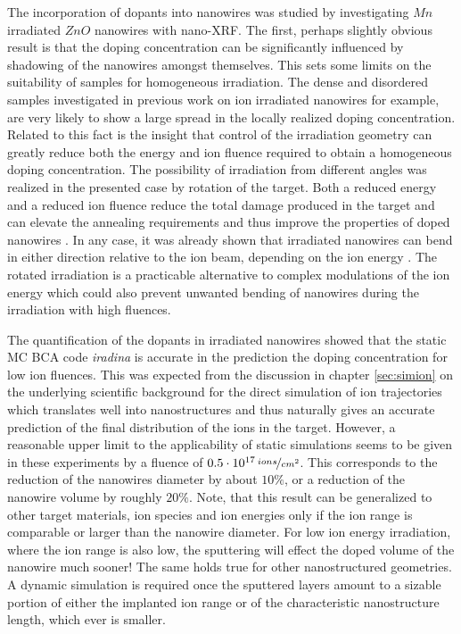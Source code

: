 The incorporation of dopants into nanowires was studied by investigating $Mn$ irradiated $ZnO$ nanowires with nano-XRF. The first, perhaps slightly obvious result is that the doping concentration can be significantly influenced by shadowing of the nanowires amongst themselves. This sets some limits on the suitability of samples for homogeneous irradiation. The dense and disordered samples investigated in previous work on ion irradiated nanowires \cite{geburt_rare_2008,ronning_ion_2010,kaiser_defect_2011,geburt_lasing_2012,geburt_intense_2013,kaiser_luminescence_2013,geburt_intense_2014,chu_nano-x-ray_2014} for example, are very likely to show a large spread in the locally realized doping concentration. Related to this fact is the insight that control of the irradiation geometry can greatly reduce both the energy and ion fluence required to obtain a homogeneous doping concentration. The possibility of irradiation from different angles was realized in the presented case by rotation of the target. Both a reduced energy and a reduced ion fluence reduce the total damage produced in the target and can elevate the annealing requirements and thus improve the properties of doped nanowires \cite{borschel_new_2011,paschoal_hopping_2012,borschel_ion-solid_2012,kumar_magnetic_2013,paschoal_magnetoresistance_2014}. In any case, it was already shown that irradiated nanowires can bend in either direction relative to the ion beam, depending on the ion energy \cite{borschel_permanent_2011}. The rotated irradiation is a practicable alternative to complex modulations of the ion energy which could also prevent unwanted bending of nanowires during the irradiation with high fluences.

The quantification of the dopants in irradiated nanowires showed that the static MC BCA code \emph{iradina} is accurate in the prediction the doping concentration for low ion fluences. This was expected from the discussion in chapter \ref{sec:simion} on the underlying scientific background for the direct simulation of ion trajectories which translates well into nanostructures and thus naturally gives an accurate prediction of the final distribution of the ions in the target. However, a reasonable upper limit to the applicability of static simulations seems to be given in these experiments by a fluence of $0.5\cdot 10^{17}\,\nicefrac{ions}{cm^2}$. This corresponds to the reduction of the nanowires diameter by about $10\%$, or a reduction of the nanowire volume by roughly $20\%$. Note, that this result can be generalized to other target materials, ion species and ion energies only if the ion range is comparable or larger than the nanowire diameter. For low ion energy irradiation, where the ion range is also low, the sputtering will effect the doped volume of the nanowire much sooner! The same holds true for other nanostructured geometries. A dynamic simulation is required once the sputtered layers amount to a sizable portion of either the implanted ion range or of the characteristic nanostructure length, which ever is smaller. 

